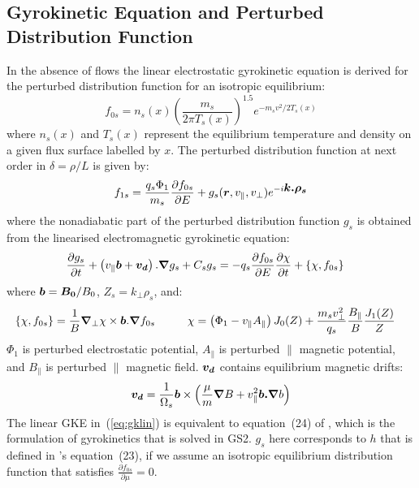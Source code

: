 \documentclass[10pt,a4paper]{article}
\newcommand{\grad}{{\bfm \nabla}}
\newcommand{\pd}[2]{\frac{\partial{#1}}{\partial{#2}} }
\newcommand{\bfm}[1]{\mbox{{\boldmath $ { #1}$}}}
\begin{document}
\subsection{\label{GKE} Gyrokinetic Equation and Perturbed Distribution
  Function}

In the absence of flows the linear electrostatic gyrokinetic equation is
derived for the perturbed distribution function for an isotropic equilibrium:
\[ f_{0s} = n_s(x) \left(\frac{m_s}{2\pi T_s(x)}\right)^{1.5} e^{-m_s
  v^2/2T_s(x)}
\]
where $n_s(x)$ and $T_s(x)$ represent the equilibrium temperature and density
on a given flux surface labelled by $x$. The perturbed distribution function
at next order in $\delta= \rho/L$ is given by:
\begin{equation}
f_{1s} = \frac{q_s \Phi_1}{m_s} \pd{f_{0s}}{E} +
g_s(\bfm{r},v_{\parallel},v_{\perp}) e^{-i\bfm{k.\rho_s}} \label{eq:f1}
\end{equation}
where the nonadiabatic part of the perturbed distribution function $g_s$ is
obtained from the linearised electromagnetic gyrokinetic equation:
\begin{align}
\frac{\partial g_s}{\partial t} + \left( v_{\parallel} \bfm{b} + \bfm{v_d}
\right). \grad{g_s} +C_s g_s & =  -q_s \pd{f_{0s}}{E} \pd{\chi}{t} +  \left\{
  \chi, f_{0s}\right\} \label{eq:gklin}
\end{align}
where $\bfm{b}=\bfm{B_0}/B_0$, $Z_s=k_{\perp} \rho_s$, and:
\begin{align*}
\{ \chi,f_{0s} \} = \frac{1}{B} \grad_{\perp} \chi \times \bfm{b}
.\grad{f_{0s}} \hspace*{1cm}& \chi = \left( \Phi_1 - v_{\parallel}
  A_{\parallel} \right) J_0(Z) + \frac{m_s v_{\perp}^2}{q_s}
\frac{B_{\parallel}}{B} \frac{J_1(Z)}{Z} 
\end{align*}
$\Phi_1$ is perturbed electrostatic potential, $A_{\parallel}$ is perturbed
$\parallel$ magnetic potential, and $B_{\parallel}$ is perturbed $\parallel$
magnetic field.  $\bfm{v_d}$ contains equilibrium magnetic drifts:
\begin{align*}
 \bfm{v_d} = \frac{1}{\Omega_s} \bfm{b} \times
\left( \frac{\mu}{m} \grad{B} + v_{\parallel}^2 \bfm{b.}\grad{b} \right)
\end{align*}
The linear GKE in~(\ref{eq:gklin}) is equivalent to equation~(24) of
\cite{antonsen_PF1980}, which is the formulation of gyrokinetics that is
solved in GS2.  $g_s$ here corresponds to $h$ that is defined in
\cite{antonsen_PF1980}'s equation~(23), if we assume an isotropic equilibrium
distribution function that satisfies $\pd{f_{0s}}{\mu}=0$.
\end{document}
